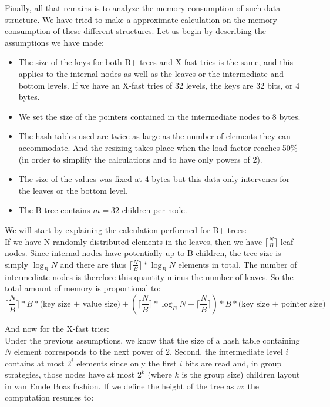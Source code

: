 Finally, all that remains is to analyze the memory consumption of such data structure. We have tried to make a approximate calculation on the memory consumption of these different structures. Let us begin by describing the assumptions we have made:
\begin{itemize}
    \item The size of the keys for both B+-trees and X-fast tries is the same, and this applies to the internal nodes as well as the leaves or the intermediate and bottom levels. If we have an X-fast tries of 32 levels, the keys are 32 bits, or 4 bytes.
    \item We set the size of the pointers contained in the intermediate nodes to 8 bytes.
    \item The hash tables used are twice as large as the number of elements they can accommodate. And the resizing takes place when the load factor reaches 50\% (in order to simplify the calculations and to have only powers of 2).
    \item The size of the values was fixed at 4 bytes but this data only intervenes for the leaves or the bottom level.
    \item The B-tree contains $m = 32$ children per node.\\
\end{itemize}

We will start by explaining the calculation performed for B+-trees:\\
If we have N randomly distributed elements in the leaves, then we have $\lceil \frac{N}{B} \rceil$ leaf nodes. Since internal nodes have potentially up to B children, the tree size is simply $\log_{B} N$ and there are thus $\lceil \frac{N}{B} \rceil * \log_{B} N$ elements in total. The number of intermediate nodes is therefore this quantity minus the number of leaves. So the total amount of memory is proportional to:
$$ \lceil \frac{N}{B} \rceil * B * \text{(key size + value size)} +( \lceil \frac{N}{B} \rceil * \log_{B} N - \lceil \frac{N}{B} \rceil) * B * \text{(key size + pointer size)} $$

And now for the X-fast tries:\\
Under the previous assumptions, we know that the size of a hash table containing $N$ element corresponds to the next power of $2$. Second, the intermediate level $i$ contains at most $2^{i}$ elements since only the first $i$ bits are read and, in group strategies, those nodes have at most $2^{k}$ (where $k$ is the group size) children layout in van Emde Boas fashion. If we define the height of the tree as $w$; the computation resumes to:

